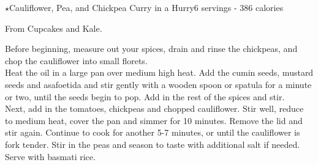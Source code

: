 \begin{recipe}{$\star$Cauliflower, Pea, and Chickpea Curry in a Hurry}{6 servings - 386 calories}{}

\freeform From Cupcakes and Kale.


Before beginning, measure out your spices, drain and rinse the chickpeas, and chop the cauliflower into small florets.\\

Heat the oil in a large pan over medium high heat. Add the cumin seeds, mustard seeds and asafoetida and stir gently with a wooden spoon or spatula for a minute or two, until the seeds begin to pop. Add in the rest of the spices and stir.\\

Next, add in the tomatoes, chickpeas and chopped cauliflower. Stir well, reduce to medium heat, cover the pan and simmer for 10 minutes. Remove the lid and stir again. Continue to cook for another 5-7 minutes, or until the cauliflower is fork tender. Stir in the peas and season to taste with additional salt if needed. Serve with basmati rice.

\end{recipe}